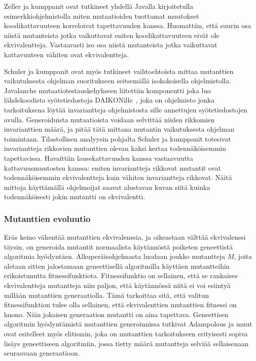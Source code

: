 \documentclass{tktltiki}
\begin{document}
Zeller ja kumppanit ovat tutkineet yhdellä Javalla kirjoitetulla esimerkkiohjelmistolla miten mutaatioiden tuottamat muutokset koodikattavuuteen korreloivat tapettavuuden kanssa. Huomattiin, että suurin osa niistä mutanteista jotka vaikuttavat eniten koodikattavuuteen eivät ole ekvivalentteja. Vastaavasti iso osa niistä mutanteista jotka vaikuttavat kattavuuteen vähiten ovat ekvivalentteja. 

Schuler ja kumppanit ovat myös tutkineet vaihtoehtoista mittaa mutanttien vaikutuksesta ohjelman suoritukseen seitsemällä isokokoisella ohjelmistolla. Javalanche mutaatiotestauskehykseen liitettiin komponentti joka luo lähdekoodista syötetiedostoja DAIKONille~\cite{}, joka on ohjelmisto jonka tarkoituksena löytää invariantteja ohjelmistosta sille annettujen syötetiedostojen avulla. Generoiduista mutaatioista voidaan selvittää niiden rikkomien invarianttien määrä, ja pitää tätä mittana mutantin vaikutuksesta ohjelman toimintaan. Tilastollisen analyysin pohjalta Schuler ja kumppanit totesivat invariantteja rikkovien mutanttien olevan kaksi kertaa todennäköisemmin tapettavissa. Havaittiin lausekattavuuden kanssa vastaavuutta kattavuusmuutosten kanssa: eniten invariantteja rikkovat mutantit ovat todennäköisemmin ekvivalentteja kuin vähiten invariantteja rikkovat. Näitä mittoja käyttämällä ohjelmoijat saavat alustavan kuvan siitä kuinka todennäköisesti jokin mutantti on ekvivalentti.

\subsubsection{Mutanttien evoluutio}
Eräs keino vähentää mutanttien ekvivalenssia, ja oikeastaan välttää ekvivalenssi täysin, on generoida mutantit normaalista käytännöstä poiketen geneettistä algoritmia hyödyntäen. Alkuperäisohjelmasta luodaan joukko mutantteja $M$, joita aletaan sitten jalostamaan geneettisellä algoritmilla käyttäen mutantteihin erikoistunutta fitnessifunktiota. Fitnessifunktio on sellainen, että se rankaisee ekvivalentteja mutantteja niin paljon, että käytännössä niitä ei voi esiintyä millään mutanttien generaatiolla. Tämä tarkoittaa sitä, että valitun fitnessifunktion tulee olla sellainen, että ekvivalenttien mutanttien fitnessi on huono. Näin jokaisen generaation mutantti on aina tapettava. Geneettisen algoritmin hyödyntämistä mutanttien generoinnissa tutkivat Adampolous ja muut ovat esitelleet myös elitismin, joka on mutanttien tarkoitukseen erityisesti sopiva lisäys geneettiseen algoritmiin, jossa tietty määrä mutantteja selviää sellaisenaan seuraavaan generaatioon.
\end{document}
